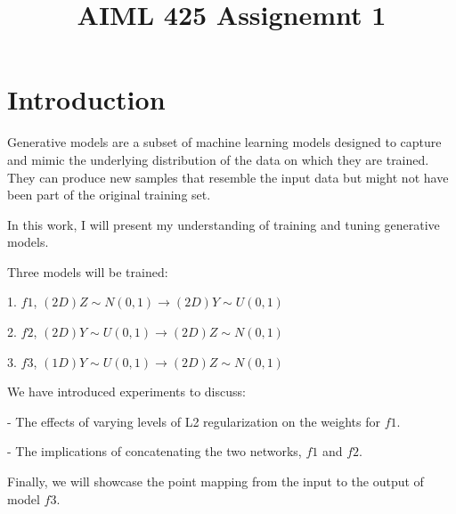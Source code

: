 \documentclass{article}
\title{AIML 425 Assignemnt 1}
\begin{document}
%
\maketitle
%
\section{Introduction}
\label{sec:intro}

Generative models are a subset of machine learning models designed to capture and mimic the underlying distribution of the data on which they are trained. They can produce new samples that resemble the input data but might not have been part of the original training set.

In this work, I will present my understanding of training and tuning generative models.

Three models will be trained:

1. $f1$, $(2D)Z\sim N(0,1) \rightarrow (2D)Y\sim U(0,1)$

2. $f2$, $(2D)Y\sim U(0,1) \rightarrow (2D)Z\sim N(0,1)$

3. $f3$, $(1D) Y\sim U(0,1) \rightarrow (2D) Z\sim N(0,1)$

We have introduced experiments to discuss:

  - The effects of varying levels of L2 regularization on the weights for $f1$.
  
  - The implications of concatenating the two networks, $f1$ and $f2$.

Finally, we will showcase the point mapping from the input to the output of model $f3$.

  
\end{document}
